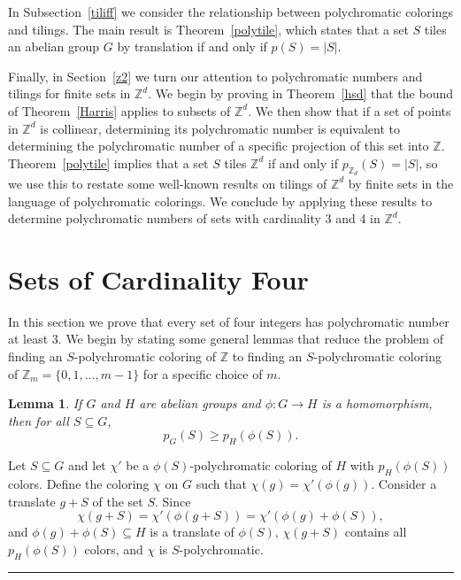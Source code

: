 \documentclass[12pt]{article}
\newenvironment{proof}{{\bf Proof:  }}{\hfill\rule{2mm}{2mm}}
\newtheorem{lemma}[theorem]{Lemma}
\newcommand{\Z}{\ensuremath{\mathbb Z}}
\begin{document}
In Subsection~\ref{tiliff} we consider the relationship between polychromatic colorings and tilings.  The main result is Theorem~\ref{polytile}, which states that a set $S$ tiles an abelian group $G$ by translation if and only if $p(S)=|S|$. 

Finally, in Section~\ref{z2} we turn our attention to polychromatic numbers and tilings for finite sets in $\Z^d$.  We begin by proving in Theorem~\ref{hsd} that the bound of Theorem~\ref{Harris} applies to subsets of  $\Z^d$. We then show that if a set of points in $\Z^d$ is collinear, determining its polychromatic number is equivalent to determining the polychromatic number of a specific projection of this set into $\Z$. Theorem~\ref{polytile} implies that a set $S$ tiles $\Z^d$ if and only if $p_{\Z_d}(S)=|S|$, so we use this to restate some well-known results on tilings of $\Z^d$ by finite sets in the language of polychromatic colorings.   We conclude by applying these results to determine polychromatic numbers of sets with cardinality 3 and 4 in $\Z^d$.


\section{Sets of Cardinality Four}\label{ss4}
In this section we prove that every set of four integers has polychromatic number at least 3. We begin by stating some general lemmas that reduce the problem of finding an $S$-polychromatic coloring of $\Z$ to finding an $S$-polychromatic coloring of $\Z_m= \{0,1,\ldots,m-1\}$ for a specific choice of $m$.


\begin{lemma}\label{hom}
If $G$ and $H$ are abelian groups and $\phi: G \to H$ is a homomorphism, then for all $S \subseteq G$, \[p_G(S) \ge p_H(\phi(S)).\]
\end{lemma}

\begin{proof}
Let $S \subseteq G$ and let $\chi'$ be a $\phi(S)$-polychromatic coloring of $H$ with $p_H(\phi(S))$ colors. Define the coloring $\chi$ on $G$ such that $\chi(g) = \chi'(\phi(g))$.  Consider a translate $g+S$ of the set $S$. Since
\[\chi(g+S) = \chi'(\phi(g+S)) = \chi'(\phi(g) + \phi(S)),\]
 and $\phi(g) + \phi(S) \subseteq H$ is a translate of $\phi(S)$, $\chi(g+S)$ contains all $p_H(\phi(S))$ colors, and $\chi$ is $S$-polychromatic.
\end{proof}
\end{document}
